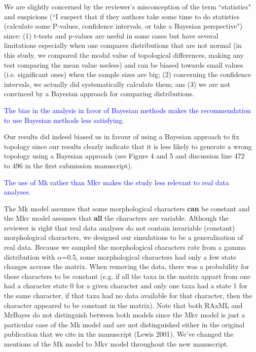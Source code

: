 \documentclass[11pt]{letter}
\begin{document}
\begin{letter}{}
We are slightly concerned by the reviewer's misconception of the term ``statistics" and suspicions (``I suspect that if they authors take some time to do statistics (calculate some P-values, confidence intervals, or take a Bayesian perspective") since: (1) t-tests and p-values are useful in some cases but have several limitations especially when one compares distributions that are not normal (in this study, we compared the modal value of topological differences, making any test comparing the mean value useless) and can be biased towards small values (i.e. significant ones) when the sample sizes are big; (2) concerning the confidence intervals, we actually did systematically calculate them; ans (3) we are not convinced by a Bayesian approach for comparing distributions.

\textcolor{blue}{The bias in the analysis in favor of Bayesian methods makes the recommendation to use Bayesian methods less satisfying.}

Our results did indeed biased us in favour of using a Bayesian approach to fix topology since our results clearly indicate that it is less likely to generate a wrong topology using a Bayesian approach (see Figure 4 and 5 and discussion line 472 to 496 in the first submission manuscript).

\textcolor{blue}{The use of Mk rather than Mkv makes the study less relevant to real data analyses.}

The Mk model assumes that some morphological characters \textbf{can} be constant and the Mkv model assumes that \textbf{all} the characters are variable. Although the reviewer is right that real data analyses do not contain invariable (constant) morphological characters, we designed our simulations to be a generalisation of real data. Because we sampled the morphological characters rate from a gamma distribution with $\alpha$=0.5, some morphological characters had only a few state changes accross the matrix. When removing the data, there was a probability for these characters to be constant (e.g. if all the taxa in the matrix appart from one had a character state 0 for a given character and only one taxa had a state 1 for the same character, if that taxa had no data available for that character, then the character appeared to be constant in the matrix). Note that both RAxML and MrBayes do not distinguish between both models since the Mkv model is just a particular case of the Mk model and are not distinguished either in the original publication that we cite in the manuscript (Lewis 2001). We've changed the mentions of the Mk model to Mkv model throughout the new manuscript.


\end{letter}
\end{document}
